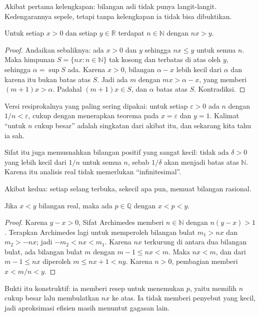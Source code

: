 Akibat pertama kelengkapan: bilangan asli tidak punya langit-langit. Kedengarannya
sepele, tetapi tanpa kelengkapan ia tidak bisa dibuktikan.

\begin{teorema}
Untuk setiap $x>0$ dan setiap $y\in\mathbb{R}$ terdapat $n\in\mathbb{N}$ dengan
$nx>y$.
\end{teorema}

\begin{proof}
Andaikan sebaliknya: ada $x>0$ dan $y$ sehingga $nx\le y$ untuk semua $n$. Maka himpunan
$S=\{nx: n\in\mathbb{N}\}$ tak kosong dan terbatas di atas oleh $y$, sehingga
$\alpha=\sup S$ ada. Karena $x>0$, bilangan $\alpha-x$ lebih kecil dari $\alpha$ dan
karena itu bukan batas atas $S$. Jadi ada $m$ dengan $mx>\alpha-x$, yang memberi
$(m+1)x>\alpha$. Padahal $(m+1)x\in S$, dan $\alpha$ batas atas $S$. Kontradiksi.
\end{proof}

Versi resiprokalnya yang paling sering dipakai: untuk setiap $\varepsilon>0$ ada
$n$ dengan $1/n<\varepsilon$, cukup dengan menerapkan teorema pada $x=\varepsilon$ dan
$y=1$. Kalimat ``untuk $n$ cukup besar'' adalah singkatan dari akibat itu, dan sekarang
kita tahu ia sah.

Sifat itu juga memusnahkan bilangan positif yang sangat kecil: tidak ada $\delta>0$
yang lebih kecil dari $1/n$ untuk semua $n$, sebab $1/\delta$ akan menjadi batas atas
$\mathbb{N}$. Karena itu analisis real tidak memerlukan ``infinitesimal''.

Akibat kedua: setiap selang terbuka, sekecil apa pun, memuat bilangan rasional.

\begin{teorema}
Jika $x<y$ bilangan real, maka ada $p\in\mathbb{Q}$ dengan $x<p<y$.
\end{teorema}

\begin{proof}
Karena $y-x>0$, Sifat Archimedes memberi $n\in\mathbb{N}$ dengan $n(y-x)>1$. Terapkan
Archimedes lagi untuk memperoleh bilangan bulat $m_1>nx$ dan $m_2>-nx$; jadi
$-m_2<nx<m_1$. Karena $nx$ terkurung di antara dua bilangan bulat, ada bilangan bulat
$m$ dengan $m-1\le nx<m$. Maka $nx<m$, dan dari $m-1\le nx$ diperoleh
$m\le nx+1<ny$. Karena $n>0$, pembagian memberi $x<m/n<y$.
\end{proof}

Bukti itu konstruktif: ia memberi resep untuk menemukan $p$, yaitu memilih $n$ cukup
besar lalu membulatkan $nx$ ke atas. Ia tidak memberi penyebut yang kecil, jadi
aproksimasi efisien masih menuntut gagasan lain.

